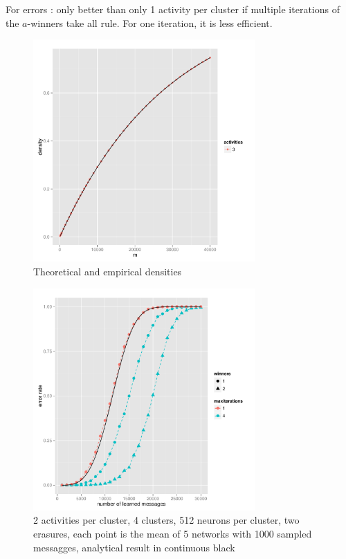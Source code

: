 \documentclass[english,11pt,twocolumn]{article}
\theoremstyle{definition}
\begin{document}
	For errors : only better than only 1 activity per cluster if multiple iterations of the $a$-winners take all rule.
	For one iteration, it is less efficient.
	\begin{figure}
		\includegraphics[width=8.5cm]{densiteexemple.pdf}
		\caption{Theoretical and empirical densities}
	\end{figure}
	
	\begin{figure}
		\includegraphics[width=8.5cm]{comparaison_regles_pool5_a2c4l512e2}
		\caption{2 activities per cluster, 4 clusters, 512 neurons per cluster, two erasures, each point is the mean of 5 networks with 1000 sampled messagges, analytical result in continuous black}
		\end{figure}	
		
\end{document}
